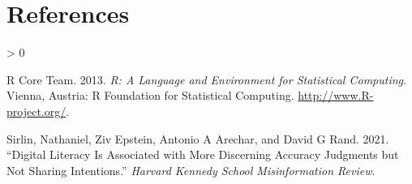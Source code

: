 \documentclass[
]{article}
\newlength{\cslhangindent}
\newenvironment{CSLReferences}[2] %
 {%
  \setlength{\parindent}{0pt}
  \ifodd #1 \everypar{\setlength{\hangindent}{\cslhangindent}}\ignorespaces\fi
  \ifnum #2 > 0
  \setlength{\parskip}{#2\baselineskip}
  \fi
 }%
 {}
\begin{document}
\newpage

\hypertarget{references}{%
\section*{References}\label{references}}

\hypertarget{refs}{}
\begin{CSLReferences}{1}{0}
\leavevmode\hypertarget{ref-r}{}%
R Core Team. 2013. \emph{R: A Language and Environment for Statistical Computing}. Vienna, Austria: R Foundation for Statistical Computing. \url{http://www.R-project.org/}.

\leavevmode\hypertarget{ref-sirlin2021digital}{}%
Sirlin, Nathaniel, Ziv Epstein, Antonio A Arechar, and David G Rand. 2021. {``Digital Literacy Is Associated with More Discerning Accuracy Judgments but Not Sharing Intentions.''} \emph{Harvard Kennedy School Misinformation Review}.

\end{CSLReferences}
\end{document}
